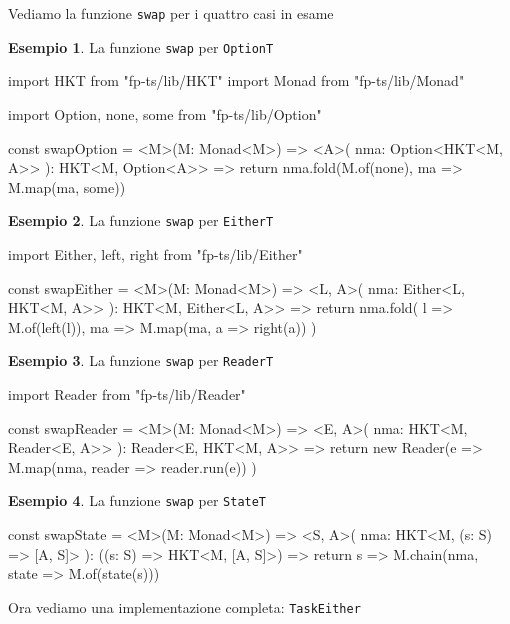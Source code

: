 \documentclass[12pt]{article}
\theoremstyle{definition}
\newtheorem{example}{Esempio}[section]
\newenvironment{code}
  {\vspace{0.5cm} \VerbatimEnvironment\begin{typescriptcode}}
  {\end{typescriptcode} \vspace{0.2cm}}
\begin{document}
Vediamo la funzione \texttt{swap} per i quattro casi in esame

\begin{example}
La funzione \texttt{swap} per \texttt{OptionT}

\begin{code}
import { HKT } from "fp-ts/lib/HKT"
import { Monad } from "fp-ts/lib/Monad"

import { Option, none, some } from "fp-ts/lib/Option"

const swapOption = <M>(M: Monad<M>) => <A>(
  nma: Option<HKT<M, A>>
): HKT<M, Option<A>> => {
  return nma.fold(M.of(none), ma => M.map(ma, some))
}
\end{code}
\end{example}

\begin{example}
La funzione \texttt{swap} per \texttt{EitherT}

\begin{code}
import { Either, left, right } from "fp-ts/lib/Either"

const swapEither = <M>(M: Monad<M>) => <L, A>(
  nma: Either<L, HKT<M, A>>
): HKT<M, Either<L, A>> => {
  return nma.fold(
    l => M.of(left(l)),
    ma => M.map(ma, a => right(a))
  )
}
\end{code}
\end{example}

\begin{example}
La funzione \texttt{swap} per \texttt{ReaderT}

\begin{code}
import { Reader } from "fp-ts/lib/Reader"

const swapReader = <M>(M: Monad<M>) => <E, A>(
  nma: HKT<M, Reader<E, A>>
): Reader<E, HKT<M, A>> => {
  return new Reader(e =>
    M.map(nma, reader => reader.run(e))
  )
}
\end{code}
\end{example}

\begin{example}
La funzione \texttt{swap} per \texttt{StateT}

\begin{code}
const swapState = <M>(M: Monad<M>) => <S, A>(
  nma: HKT<M, (s: S) => [A, S]>
): ((s: S) => HKT<M, [A, S]>) => {
  return s => M.chain(nma, state => M.of(state(s)))
}
\end{code}
\end{example}

Ora vediamo una implementazione completa: \texttt{TaskEither}
\end{document}
